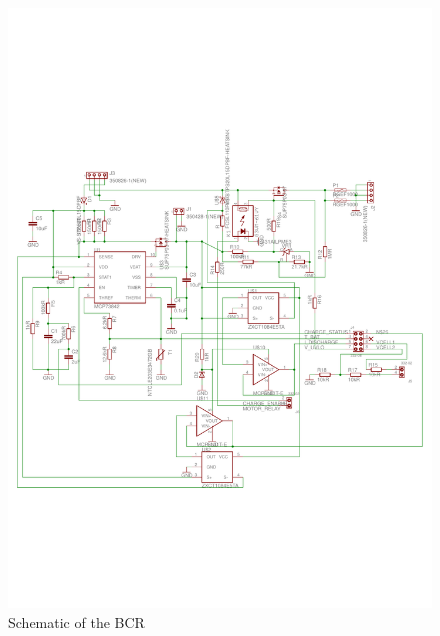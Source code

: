 %
\begin{figure}[H]
\centering
\includegraphics[width=\textwidth]{figures/fig_Schematic_BCR}
\caption{Schematic of the \acl{BCR}}
\label{fig:BCR_Schematic}
\end{figure}
%
%
